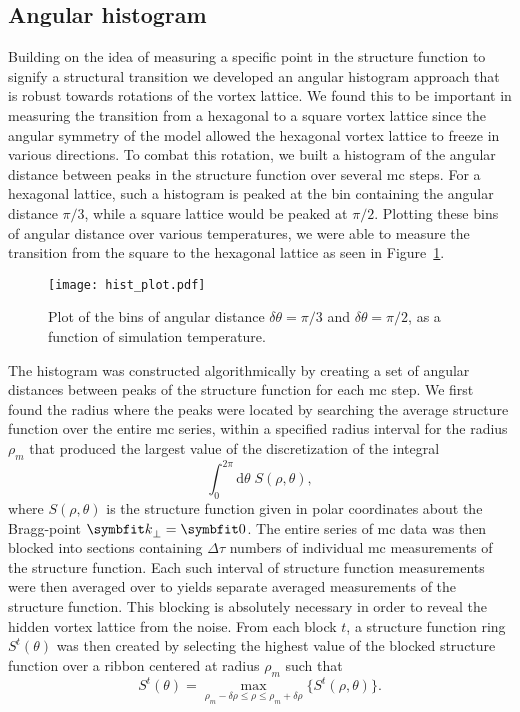 \subsection{Angular histogram}

Building on the idea of measuring a specific point in the structure function to signify a structural transition we developed an angular histogram approach that is robust towards rotations of the
vortex lattice. We found this to be important in measuring the transition from a hexagonal to a square vortex lattice since the angular symmetry of the model allowed the hexagonal vortex lattice to
freeze in various directions. To combat this rotation, we built a histogram of the angular distance between peaks in the structure function over several \ac{mc} steps. For a hexagonal
lattice, such a histogram is peaked at the bin containing  the angular distance $\pi/3$, while a square lattice would be peaked at $\pi/2$. Plotting these bins of angular distance over various
temperatures, we were able to measure the transition from the square to the hexagonal lattice as seen in Figure~\ref{fig:Vor:Symm:AH:histPrTemp}.

\begin{figure}[h]
    \centering
    \texttt{[image: hist\_plot.pdf]}
    \caption{Plot of the bins of angular distance $\delta\theta = \pi/3$ and $\delta\theta = \pi/2$, as a function of simulation temperature.}
    \label{fig:Vor:Symm:AH:histPrTemp}
\end{figure}

The histogram was constructed algorithmically by creating a set of angular distances between peaks of the structure function for each \ac{mc} step. We first found the radius where the peaks were
located by searching the average structure function over the entire \ac{mc} series, within a specified radius interval for the radius $\rho_m$ that produced the largest value of the
discretization of the integral
\begin{equation}
    \label{eq:Vor:Symm:AH:searchIntegral}
    \int_0^{2\pi}\!\!\!\!\!\!\mathrm{d}\theta\; S(\rho,\theta),
\end{equation}
where $S(\rho,\theta)$ is the structure function given in polar coordinates about the Bragg-point $\v{k}_\perp = \v{0}$. The entire series of \ac{mc} data was then blocked into sections
containing $\Delta\tau$ numbers of individual \ac{mc} measurements of the structure function. Each such interval of structure function measurements were then averaged over to yields separate
averaged measurements of the structure function. This blocking is absolutely necessary in order to reveal the hidden vortex lattice from the noise. From each block $t$,
a structure function ring $S^t(\theta)$ was then created by selecting the highest value of the blocked structure function over a ribbon centered at radius $\rho_m$ such that
\begin{equation}
    \label{eq:Vor:Symm:AH:ribbonMaximum}
    S^t(\theta) = \max_{\rho_m-\delta\rho\leq\rho\leq\rho_m+\delta\rho}\{S^t(\rho,\theta)\}.
\end{equation}

